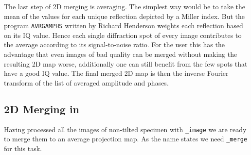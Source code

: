 The last step of 2D merging is averaging. The simplest way would be to take the mean of the values for each unique reflection depicted by a Miller index. But the program \texttt{AVRGAMPHS} written by Richard Henderson weights each reflection based on its IQ value. Hence each single diffraction spot of every image contributes to the average according to its signal-to-noise ratio. For the user this has the advantage that even images of bad quality can be merged without making the resulting 2D map worse, additionally one can still benefit from the few spots that have a good IQ value. The final merged 2D map is then the inverse Fourier transform of the list of averaged amplitude and phases. 

\subsection{2D Merging in {\twodx}}

Having processed all the images of non-tilted specimen with {\twodx}\texttt{\_image} we are ready to merge them to an average projection map. As the name states we need {\twodx}\texttt{\_merge} for this task.

